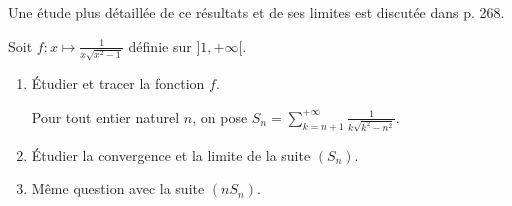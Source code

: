 \begin{remarque}
Une étude plus détaillée de ce résultats et de ses limites est discutée dans \cite{truc2019} p. 268.
\end{remarque}


\begin{exercice}
\cite{RMS 888 2016 - ENSAM}
Soit $f : x \mapsto \frac{1}{x \sqrt{x^2 - 1}}$ définie sur $]1, +\infty[$.
\begin{enumerate}
\item Étudier et tracer la fonction $f$.

\smallskip
Pour tout entier naturel $n$, on pose $S_n = \sum\limits_{k=n+1}^{+\infty} \frac{1}{k \sqrt{k^2 - n^2}}$.
\item Étudier la convergence et la limite de la suite $(S_n)$.

\item Même question avec la suite $(n S_n)$.
\end{enumerate}
\end{exercice}


